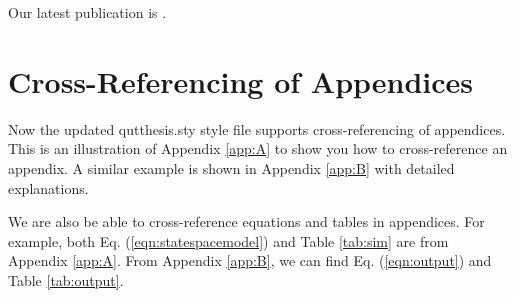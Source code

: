Our latest publication is \citep{PengIEEETSMCA11}. 

\section{Cross-Referencing of Appendices}

Now the updated qutthesis.sty style file supports cross-referencing of appendices. This is an illustration of Appendix \ref{app:A} to show you how to cross-reference an appendix. A similar example is shown in Appendix \ref{app:B} with detailed explanations. 

We are also be able to cross-reference equations and tables in appendices. For example, both Eq. (\ref{eqn:statespacemodel}) and Table \ref{tab:sim} are from Appendix \ref{app:A}.  From Appendix \ref{app:B}, we can find Eq. (\ref{eqn:output}) and Table \ref{tab:output}. 

